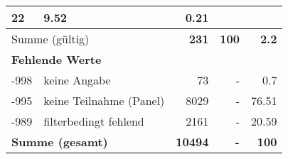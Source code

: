 \begin{longtable}{lXrrr}
       \num{22} &
       \num[round-mode=places,round-precision=2]{9.52} &
         \num[round-mode=places,round-precision=2]{0.21} \\
     \midrule
     \multicolumn{2}{l}{Summe (gültig)} &
       \textbf{\num{231}} &
     \textbf{\num{100}} &
       \textbf{\num[round-mode=places,round-precision=2]{2.2}} \\
     \multicolumn{5}{l}{\textbf{Fehlende Werte}}\\
       -998 &
       keine Angabe &
         \num{73} &
        - &
         \num[round-mode=places,round-precision=2]{0.7} \\
       -995 &
       keine Teilnahme (Panel) &
         \num{8029} &
        - &
         \num[round-mode=places,round-precision=2]{76.51} \\
       -989 &
       filterbedingt fehlend &
         \num{2161} &
        - &
         \num[round-mode=places,round-precision=2]{20.59} \\
     \midrule
     \multicolumn{2}{l}{\textbf{Summe (gesamt)}} &
          \textbf{\num{10494}} &
        \textbf{-} &
        \textbf{\num{100}} \\
     \bottomrule
     \end{longtable}
     
